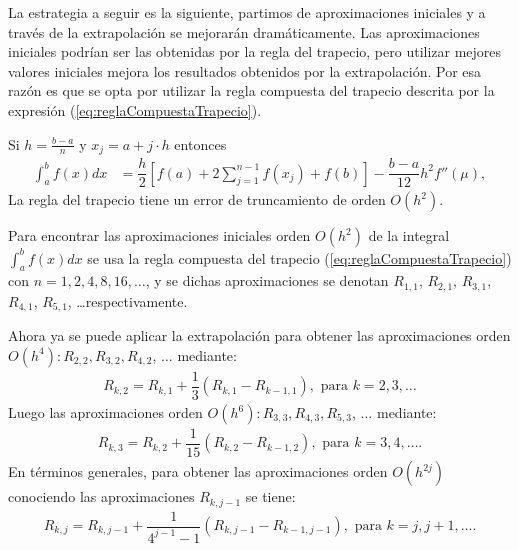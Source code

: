 La estrategia a seguir es la siguiente, partimos de aproximaciones iniciales y a través de la extrapolación se mejorarán dramáticamente.
Las aproximaciones iniciales podrían ser las obtenidas por la regla del trapecio, pero utilizar mejores valores iniciales mejora
los resultados obtenidos por la extrapolación. Por esa razón es que se opta por utilizar la regla compuesta del trapecio 
descrita por la expresión (\ref{eq:reglaCompuestaTrapecio}).


\begin{definitionT}
	Si $h=\frac{b-a}{n}$ y $x_j = a+j\cdot h$ entonces
	\begin{align}
		\int_a^b f(x)dx &= \dfrac{h}{2}\left[f(a) + 2\sum_{j=1}^{n-1} f(x_j) + f(b) \right] - \dfrac{b-a}{12}h^2f''(\mu),
		\label{eq:reglaCompuestaTrapecio}
	\end{align}	
	La regla del trapecio tiene un error de truncamiento de orden $O(h^2)$.
\end{definitionT}

Para encontrar las aproximaciones iniciales orden $O(h^2)$ de la integral $\int_a^b f(x)dx$ se usa la regla compuesta del trapecio 
(\ref{eq:reglaCompuestaTrapecio}) con $n=1,2,4,8,16,\dots$, y se dichas aproximaciones se denotan $R_{1,1}$, $R_{2,1}$, $R_{3,1}$, 
$R_{4,1}$, $R_{5,1}$, \dots respectivamente. 

Ahora ya se puede aplicar la extrapolación para obtener las aproximaciones orden $O(h^4): R_{2,2}, R_{3,2}, R_{4,2}$, $\dots$ mediante:
\begin{align*}
	R_{k,2} = R_{k,1} + \dfrac{1}{3}\left(R_{k,1} - R_{k-1,1} \right), \mbox{ para } k=2,3,\dots
\end{align*}
Luego las aproximaciones orden $O(h^6): R_{3,3}, R_{4,3}, R_{5,3}$, $\dots$ mediante:
\begin{align*}
	R_{k,3} = R_{k,2} + \dfrac{1}{15}\left(R_{k,2} - R_{k-1,2} \right), \mbox{ para } k=3,4,\dots.
\end{align*}
En términos generales, para obtener las aproximaciones orden $O(h^{2j})$ conociendo las aproximaciones $R_{k,j-1}$ se tiene:
\begin{align}
	R_{k,j} = R_{k,j-1} + \dfrac{1}{4^{j-1}-1}\left(R_{k,j-1} - R_{k-1,j-1} \right), \mbox{ para } k=j,j+1,\dots.
	\label{eq:extrapolacionRomberg}
\end{align}

